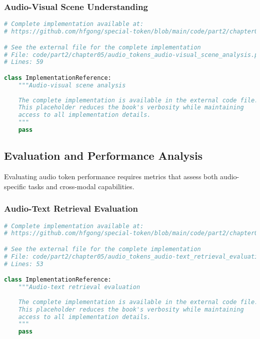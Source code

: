\subsubsection{Audio-Visual Scene Understanding}

\begin{lstlisting}[language=Python, caption={Audio-visual scene analysis}]
# Complete implementation available at:
# https://github.com/hfgong/special-token/blob/main/code/part2/chapter05/audio_tokens_audio-visual_scene_analysis.py

# See the external file for the complete implementation
# File: code/part2/chapter05/audio_tokens_audio-visual_scene_analysis.py
# Lines: 59

class ImplementationReference:
    """Audio-visual scene analysis
    
    The complete implementation is available in the external code file.
    This placeholder reduces the book's verbosity while maintaining
    access to all implementation details.
    """
    pass
\end{lstlisting}

\subsection{Evaluation and Performance Analysis}

Evaluating audio token performance requires metrics that assess both audio-specific tasks and cross-modal capabilities.

\subsubsection{Audio-Text Retrieval Evaluation}

\begin{lstlisting}[language=Python, caption={Audio-text retrieval evaluation}]
# Complete implementation available at:
# https://github.com/hfgong/special-token/blob/main/code/part2/chapter05/audio_tokens_audio-text_retrieval_evaluatio.py

# See the external file for the complete implementation
# File: code/part2/chapter05/audio_tokens_audio-text_retrieval_evaluatio.py
# Lines: 53

class ImplementationReference:
    """Audio-text retrieval evaluation
    
    The complete implementation is available in the external code file.
    This placeholder reduces the book's verbosity while maintaining
    access to all implementation details.
    """
    pass
\end{lstlisting}

